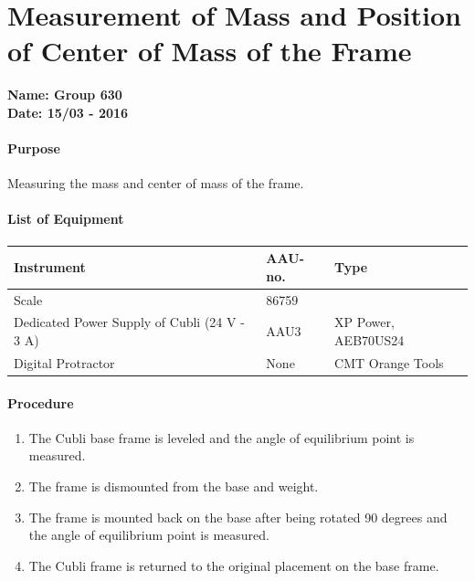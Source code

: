 \chapter{Measurement of Mass and Position of Center of Mass of the Frame }\label{app:MassFrameCenterOfMass} 
\textbf{Name: Group 630}\\
\textbf{Date: 15/03 - 2016}

\subsubsection{Purpose}
Measuring the mass and center of mass of the frame.

\subsubsection{List of Equipment}
\begin{table}[H]
	\begin{tabular}{|l|l|p{4.3cm}|}
		\hline%
		\textbf{Instrument}                                  &  \textbf{AAU-no.}  &  \textbf{Type}                       \\
		\hline%
		Scale                                           & 86759            &  		                   \\
		\hline%
		Dedicated Power Supply of Cubli \small{(24 V - 3 A)} &  AAU3                   &  XP Power, AEB70US24                 \\
		\hline%
		Digital Protractor                                   &  None               & CMT Orange Tools     \\
		\hline%
	\end{tabular}
\end{table}
\subsubsection{Procedure}
\begin{enumerate}
	\item The Cubli base frame is leveled and the angle of equilibrium point is measured.
	\item The frame is dismounted from the base and weight.
	\item The frame is mounted back on the base after being rotated 90 degrees and the angle of equilibrium point is measured.
	\item The Cubli frame is returned to the original placement on the base frame.
\end{enumerate}


